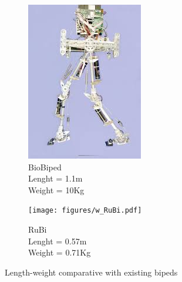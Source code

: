 \begin{figure}[htb]
\begin{subfigure}{.22\textwidth}
    \includegraphics[width=\linewidth]{figures/w_biobiped.jpg}
    \caption{BioBiped\\
    Lenght = 1.1m\\
    Weight = 10Kg}
    \label{fig:w_biobiped}
  \end{subfigure}
  \begin{subfigure}{.22\textwidth}
    \texttt{[image: figures/w\_RuBi.pdf]}
    \caption{RuBi\\
    Lenght = 0.57m\\
    Weight = 0.71Kg}
    \label{fig:w_rubi}
  \end{subfigure}
  \caption{Length-weight comparative with existing bipeds}
  \label{fig:bipedal_robots}
\end{figure}  


